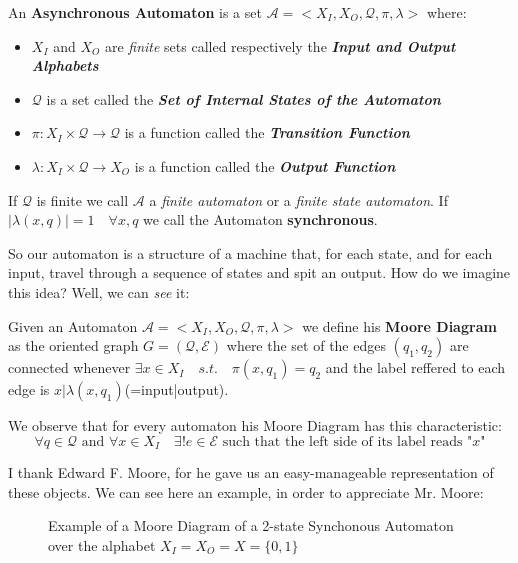 \documentclass[mat1]{fmfdeloTS}
\newcommand{\auto}{\mathcal{A}}
\newcommand{\QQ}{\mathcal{Q}}
\begin{document}
\begin{definition}
An \textbf{Asynchronous  Automaton} is a set $\auto=<X_I,X_O,\QQ,\pi,\lambda>$ where:
\begin{itemize}
	\item $X_I$ and $ X_O $ are \textit{finite} sets called respectively the \textit{\textbf{Input \emph{and} Output Alphabets}}
	\item $\QQ$ is a set called the \textit{\textbf{Set of Internal States of the  Automaton}}
	\item $\pi:X_I\times\QQ \longrightarrow \QQ $ is a function called the \textit{\textbf{Transition Function}}
	\item $\lambda:X_I\times\QQ \longrightarrow X_O $ is a function called the \textit{\textbf{Output Function}}
\end{itemize}
If $\QQ$ is finite we call $\auto$ a \textit{finite automaton} or a \textit{finite state automaton}. If $|\lambda(x,q)|=1\quad \forall x,q$ we call the Automaton \textbf{synchronous}.
\end{definition}

So our automaton is a structure of a machine that, for each state, and for each input, travel through a sequence of states and spit an output. How do we imagine this idea? Well, we can \textit{see} it:

\begin{definition}
Given an Automaton $\auto=<X_I,X_O,\QQ,\pi,\lambda>$ we define his \textbf{Moore Diagram} as the oriented graph $G=(\QQ, \mathcal{E})$ where the set of the edges $(q_1,q_2)$ are connected whenever $\exists x\in X_I\quad s.t.\quad\pi(x,q_1)=q_2$ and the label reffered to each edge is $x|\lambda(x,q_1)$(=input|output). 
\end{definition}

We observe that for every automaton his Moore Diagram has this characteristic:
\begin{equation}
\forall q\in\QQ\textrm{ and }\forall x\in X_{I} \quad\exists! e\in\mathcal{E} \textrm{ such that the left side of its label reads "}x\textrm{"}\label{(1)}
\end{equation}

I thank Edward F. Moore, for he gave us an easy-manageable representation of these objects.
We can see here an example, in order to appreciate Mr. Moore:
\begin{figure}[ht]
\caption{Example of a Moore Diagram of a 2-state Synchonous Automaton over the alphabet $X_I=X_O=X=\{0,1\}$}
\label{Fig. 2}
\end{figure}
\end{document}

